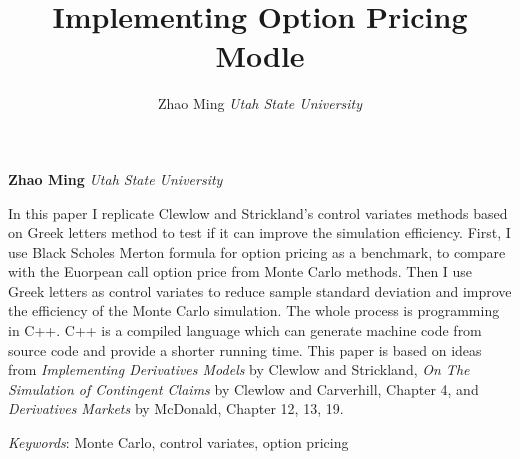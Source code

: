 \documentclass[11pt,]{article}
\title{Implementing Option Pricing Modle  }
\author{\Large Zhao Ming\vspace{0.05in} \newline\normalsize\emph{Utah State University}  }
\date{}
\newcommand*{\authorfont}{\fontfamily{phv}\selectfont}
\renewenvironment{abstract}
 {{%
    \setlength{\leftmargin}{0mm}
    \setlength{\rightmargin}{\leftmargin}%
  }%
  \relax}
 {\endlist}
\begin{document}
	
%

{%
\setlength{\parindent}{0pt}
\thispagestyle{plain}
{\fontsize{18}{20}\selectfont\raggedright 
\maketitle  %

}

{
   \vskip 13.5pt\relax \normalsize\fontsize{11}{12} 
\textbf{\authorfont Zhao Ming} \hskip 15pt \emph{\small Utah State University}   

}

}







\begin{abstract}

    \hbox{\vrule height .2pt width 39.14pc}

    \vskip 8.5pt %

\noindent In this paper I replicate Clewlow and Strickland's control variates
methods based on Greek letters method to test if it can improve the
simulation efficiency. First, I use Black Scholes Merton formula for
option pricing as a benchmark, to compare with the Euorpean call option
price from Monte Carlo methods. Then I use Greek letters as control
variates to reduce sample standard deviation and improve the efficiency
of the Monte Carlo simulation. The whole process is programming in C++.
C++ is a compiled language which can generate machine code from source
code and provide a shorter running time. This paper is based on ideas
from \emph{Implementing Derivatives Models} by Clewlow and Strickland,
\emph{On The Simulation of Contingent Claims} by Clewlow and Carverhill,
Chapter 4, and \emph{Derivatives Markets} by McDonald, Chapter 12, 13,
19.


\vskip 8.5pt \noindent \emph{Keywords}: Monte Carlo, control variates, option pricing \par

    \hbox{\vrule height .2pt width 39.14pc}



\end{abstract}
\end{document}
